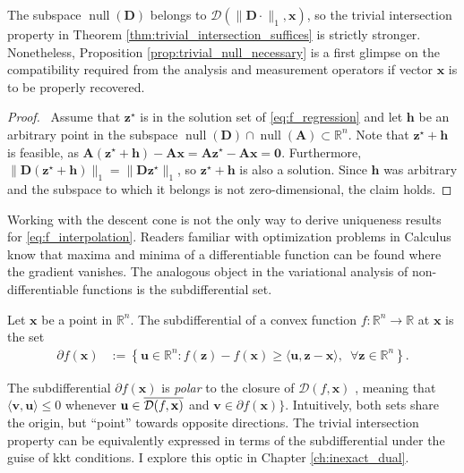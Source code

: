 The subspace $\operatorname{null} \left ( \mathbf{D} \right )$ belongs to $\mathcal{D}(\|\mathbf{D} \cdot \|_1, \mathbf{x})$, so the trivial intersection property in Theorem \ref{thm:trivial_intersection_suffices} is strictly stronger. Nonetheless, Proposition \ref{prop:trivial_null_necessary} is a first glimpse on the compatibility required from the analysis and measurement operators if vector $\mathbf{x}$ is to be properly recovered.

\begin{proof}
    \pf\ Assume that $\mathbf{z}^\star$ is in the solution set of \eqref{eq:f_regression} and let $\mathbf{h}$ be an arbitrary point in the subspace $\operatorname{null} \left ( \mathbf{D} \right ) \cap \operatorname{null} \left ( \mathbf{A} \right ) \subset \mathbb{R}^{n}$. Note that $\mathbf{z}^\star + \mathbf{h}$ is feasible, as $\mathbf{A}(\mathbf{z}^\star + \mathbf{h}) - \mathbf{Ax} = \mathbf{A}\mathbf{z}^\star - \mathbf{Ax} = \mathbf{0}$. Furthermore, $\|\mathbf{D(z^\star + h)}\|_1 = \|\mathbf{Dz^\star}\|_1$, so $\mathbf{z}^\star + \mathbf{h}$ is also a solution. Since $\mathbf{h}$ was arbitrary and the subspace to which it belongs is not zero-dimensional, the claim holds.\hfill\qedsymbol
\end{proof}

Working with the descent cone is not the only way to derive uniqueness results for \eqref{eq:f_interpolation}. Readers familiar with optimization problems in Calculus know that maxima and minima of a differentiable function can be found where the gradient vanishes. The analogous object in the variational analysis of non-differentiable functions is the subdifferential set.

\begin{definition}[Subdifferential]
    Let $\mathbf{x}$ be a point in $\mathbb{R}^{n}$. The subdifferential of a convex function $f: \mathbb{R}^{n} \to \mathbb{R}$ at $\mathbf{x}$ is the set
    \begin{align}
        \partial f(\mathbf{x}) & := \left \{ \mathbf{u} \in \mathbb{R}^{n} : f(\mathbf{z}) - f(\mathbf{x}) \geq \langle \mathbf{u}, \mathbf{z} - \mathbf{x}\rangle, \enspace \forall \mathbf{z} \in \mathbb{R}^{n}\right \}.
    \end{align}
\end{definition}

The subdifferential $\partial f(\mathbf{x})$ is \emph{polar} to the closure of $\mathcal{D}(f, \mathbf{x})$ \cite[Thm. 23.7]{rockafellar1970}, meaning that $\langle \mathbf{v}, \mathbf{u} \rangle \leq 0$ whenever $\mathbf{u} \in \mathop{\overline{\mathcal{D}(f, \mathbf{x})}}$ and $\mathbf{v} \in \partial f(\mathbf{x})\}$. Intuitively, both sets share the origin, but ``point'' towards opposite directions. The trivial intersection property can be equivalently expressed in terms of the subdifferential under the guise of \acrfull{kkt} conditions. I explore this optic in Chapter \ref{ch:inexact_dual}.

